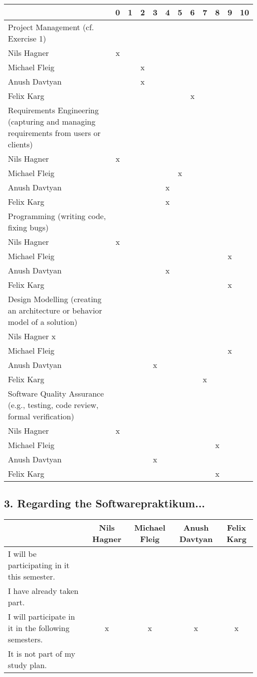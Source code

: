 \documentclass{scrartcl}
\begin{document}
\begin{tabular}{| p{10cm} | c | c | c | c | c | c | c | c | c | c | c |}
	\hline
	& 0& 1& 2& 3& 4& 5& 6& 7& 8& 9& 10\\
	\hline
	Project Management (cf. Exercise 1) \\
	\hline
	Nils Hagner &x&&&&&&&&&\\ \hline
	Michael Fleig &&&x&&&&&&&\\ \hline
	Anush Davtyan &&&x&&&&&&&\\ \hline
	Felix Karg &&&&&&&x&&&\\ \hline
	Requirements Engineering (capturing and managing requirements from users or clients)\\
	\hline
	Nils Hagner &x&&&&&&&&&\\ \hline
	Michael Fleig &&&&&&x&&&&\\ \hline
	Anush Davtyan &&&&&x&&&&&\\ \hline
	Felix Karg &&&&&x&&&&&\\ \hline
	Programming (writing code, fixing bugs)\\
	\hline
	Nils Hagner &x&&&&&&&&&\\ \hline
	Michael Fleig &&&&&&&&&&x&\\ \hline
	Anush Davtyan &&&&&x&&&&&\\ \hline
	Felix Karg &&&&&&&&&&x\\ \hline
	Design Modelling (creating an architecture or behavior model of a solution)\\
	\hline
	Nils Hagner x&&&&&&&&&&\\ \hline
	Michael Fleig &&&&&&&&&&x\\ \hline
	Anush Davtyan &&&&x&&&&&&\\ \hline
	Felix Karg &&&&&&&&x&&\\ \hline
	Software Quality Assurance (e.g., testing, code review, formal verification)\\
	\hline
	Nils Hagner &x&&&&&&&&&\\ \hline
	Michael Fleig &&&&&&&&&x&\\ \hline
	Anush Davtyan &&&&x&&&&&&\\ \hline
	Felix Karg &&&&&&&&&x&\\ \hline
\end{tabular}


\subsection*{3. Regarding the Softwarepraktikum...}
\begin{tabular} {| p{7cm} | c | c | c | c |}
	\hline
	&Nils Hagner&Michael Fleig&Anush Davtyan&Felix Karg\\
	\hline
	I will be participating in it this semester. &&&&\\
	\hline
	I have already taken part. &&&&\\
	\hline
	I will participate in it in the following semesters. &x&x&x&x\\
	\hline
	It is not part of my study plan. &&&&\\
	\hline
\end{tabular}
\end{document}

